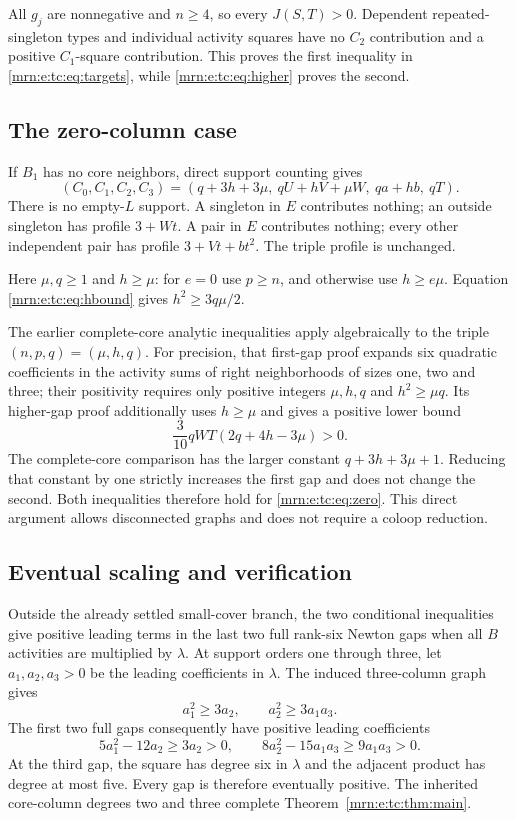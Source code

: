 \documentclass[11pt,a4paper]{article}
\theoremstyle{remark}\newtheorem{remark}[theorem]{Remark}
\begin{document}
All $g_j$ are nonnegative and $n\ge4$, so every $J(S,T)>0$. Dependent repeated-singleton types and individual activity squares have no $C_2$ contribution and a positive $C_1$-square contribution. This proves the first inequality in \eqref{mrn:e:tc:eq:targets}, while \eqref{mrn:e:tc:eq:higher} proves the second.

\subsection{The zero-column case}
If $B_1$ has no core neighbors, direct support counting gives
\begin{equation}\label{mrn:e:tc:eq:zero}
 (C_0,C_1,C_2,C_3)
 =(q+3h+3\mu,\ qU+hV+\mu W,\ qa+hb,\ qT).
\end{equation}
There is no empty-$L$ support. A singleton in $E$ contributes nothing; an outside singleton has profile $3+Wt$. A pair in $E$ contributes nothing; every other independent pair has profile $3+Vt+bt^2$. The triple profile is unchanged.

Here $\mu,q\ge1$ and $h\ge\mu$: for $e=0$ use $p\ge n$, and otherwise use $h\ge e\mu$. Equation \eqref{mrn:e:tc:eq:hbound} gives $h^2\ge3q\mu/2$.

The earlier complete-core analytic inequalities \cite{b:m43} apply algebraically to the triple $(n,p,q)=(\mu,h,q)$. For precision, that first-gap proof expands six quadratic coefficients in the activity sums of right neighborhoods of sizes one, two and three; their positivity requires only positive integers $\mu,h,q$ and $h^2\ge\mu q$. Its higher-gap proof additionally uses $h\ge\mu$ and gives a positive lower bound
\[
 \frac3{10}qWT(2q+4h-3\mu)>0.
\]
The complete-core comparison has the larger constant $q+3h+3\mu+1$. Reducing that constant by one strictly increases the first gap and does not change the second. Both inequalities therefore hold for \eqref{mrn:e:tc:eq:zero}. This direct argument allows disconnected graphs and does not require a coloop reduction.

\subsection{Eventual scaling and verification}
Outside the already settled small-cover branch, the two conditional inequalities give positive leading terms in the last two full rank-six Newton gaps when all $B$ activities are multiplied by $\lambda$. At support orders one through three, let $a_1,a_2,a_3>0$ be the leading coefficients in $\lambda$. The induced three-column graph gives
\[
 a_1^2\ge3a_2,\qquad a_2^2\ge3a_1a_3.
\]
The first two full gaps consequently have positive leading coefficients
\[
 5a_1^2-12a_2\ge3a_2>0,\qquad
 8a_2^2-15a_1a_3\ge9a_1a_3>0.
\]
At the third gap, the square has degree six in $\lambda$ and the adjacent product has degree at most five. Every gap is therefore eventually positive. The inherited core-column degrees two and three complete Theorem~\ref{mrn:e:tc:thm:main}.
\end{document}
